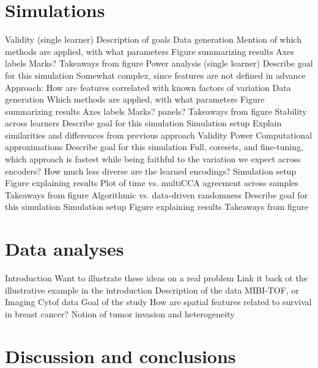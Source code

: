 \documentclass[11pt]{article}
\begin{document}
\section{Simulations}

\begin{outline}
  \1 Validity (single learner)
    \2 Description of goals
    \2 Data generation
    \2 Mention of which methods are applied, with what parameters
    \2 Figure summarizing results
      \3 Axes labels
      \3 Marks?
    \2 Takeaways from figure
  \1 Power analysis (single learner)
    \2 Describe goal for this simulation
    \2 Somewhat complex, since features are not defined in advance
    \2 Approach: How are features correlated with known factors of variation
    \2 Data generation
    \2 Which methods are applied, with what parameters
    \2 Figure summarizing results
      \3 Axes labels
      \3 Marks?
      \3 panels?
    \2 Takeaways from figure
  \1 Stability across learners
    \2 Describe goal for this simulation
    \2 Simulation setup
      \3 Explain similarities and differences from previous approach
      \3 Validity
      \3 Power
  \1 Computational approximations
    \2 Describe goal for this simulation
      \3 Full, coresets, and fine-tuning, which approach is fastest while being
      faithful to the variation we expect across encoders?
    \2 How much less diverse are the learned encodings?
    \2 Simulation setup
    \2 Figure explaining results
      \3 Plot of time vs. multiCCA agreement across samples
    \2 Takeaways from figure
  \1 Algorithmic vs. data-driven randomness
    \2 Describe goal for this simulation
    \2 Simulation setup
    \2 Figure explaining results
    \2 Takeaways from figure
\end{outline}

\section{Data analyses}

\begin{outline}
  \1 Introduction
    \2 Want to illustrate these ideas on a real problem
      \3 Link it back ot the illustrative example in the introduction
    \2 Description of the data
      \3 MIBI-TOF, or Imaging Cytof data
  \1 Goal of the study
    \2 How are spatial features related to survival in breast cancer?
    \2 Notion of tumor invasion and heterogeneity
\end{outline}

\section{Discussion and conclusions}
\end{document}
